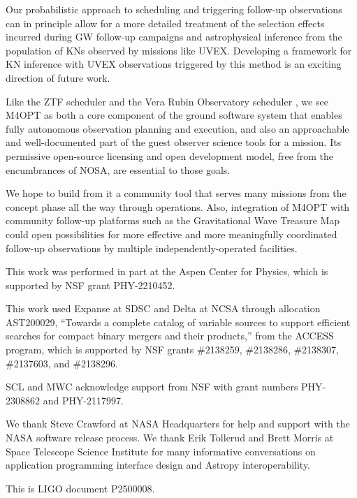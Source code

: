 \documentclass[twocolumn,times]{aastex631}
\begin{document}
Our probabilistic approach to scheduling and triggering follow-up observations can in principle allow for a more detailed treatment of the selection effects incurred during \ac{GW} follow-up campaigns and astrophysical inference from the population of \acp{KN} observed by missions like \ac{UVEX}. Developing a framework for \ac{KN} inference with \ac{UVEX} observations triggered by this method is an exciting direction of future work.

Like the \ac{ZTF} scheduler \citep{2019PASP..131f8003B} and the Vera Rubin Observatory scheduler \citep{2019AJ....157..151N}, we see \ac{M4OPT} as both a core component of the ground software system that enables fully autonomous observation planning and execution, and also an approachable and well-documented part of the guest observer science tools for a mission. Its permissive open-source licensing and open development model, free from the encumbrances of \ac{NOSA}, are essential to those goals.

We hope to build from it a community tool that serves many missions from the concept phase all the way through operations. Also, integration of \ac{M4OPT} with community follow-up platforms such as the Gravitational Wave Treasure Map \citep{2020ApJ...894..127W} could open possibilities for more effective and more meaningfully coordinated follow-up observations by multiple independently-operated facilities.

\begin{acknowledgments}
This work was performed in part at the Aspen Center for Physics, which is supported by \ac{NSF} grant PHY-2210452.

This work used Expanse at \ac{SDSC} and Delta at \ac{NCSA} through allocation AST200029, ``Towards a complete catalog of variable sources to support efficient searches for compact binary mergers and their products,'' from the \ac{ACCESS} program, which is supported by \ac{NSF} grants \#2138259, \#2138286, \#2138307, \#2137603, and \#2138296.

SCL and MWC acknowledge support from \ac{NSF} with grant numbers PHY-2308862 and PHY-2117997.

We thank Steve Crawford at NASA Headquarters for help and support with the NASA software release process. We thank Erik Tollerud and Brett Morris at Space Telescope Science Institute for many informative conversations on application programming interface design and Astropy interoperability.

This is LIGO document P2500008.
\end{acknowledgments}
\end{document}
